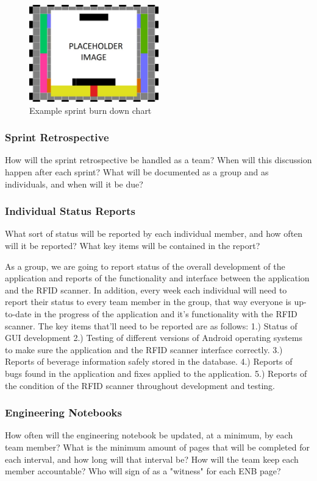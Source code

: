 \begin{figure}[h!]
    \centering
    \includegraphics[width=0.5\textwidth]{images/test_image}
    \caption{Example sprint burn down chart}
\end{figure}

\subsubsection{Sprint Retrospective}
How will the sprint retrospective be handled as a team? When will this discussion happen after each sprint? What will be documented as a group and as individuals, and when will it be due?

\subsubsection{Individual Status Reports}
What sort of status will be reported by each individual member, and how often will it be reported? What key items will be contained in the report?

As a group, we are going to report status of the overall development of the application and reports of the functionality and interface between the application and the RFID scanner.  In addition, every week each individual will need to report their status to every team member in the group, that way everyone is up-to-date in the progress of the application and it's functionality with the RFID scanner.  The key items that'll need to be reported are as follows:
1.) Status of GUI development
2.) Testing of different versions of Android operating systems to make sure the application and the RFID scanner interface correctly.
3.) Reports of beverage information safely stored in the database.
4.) Reports of bugs found in the application and fixes applied to the application.
5.) Reports of the condition of the RFID scanner throughout development and testing.

\subsubsection{Engineering Notebooks}
How often will the engineering notebook be updated, at a minimum, by each team member? What is the minimum amount of pages that will be completed for each interval, and how long will that interval be? How will the team keep each member accountable? Who will sign of as a "witness" for each ENB page?



